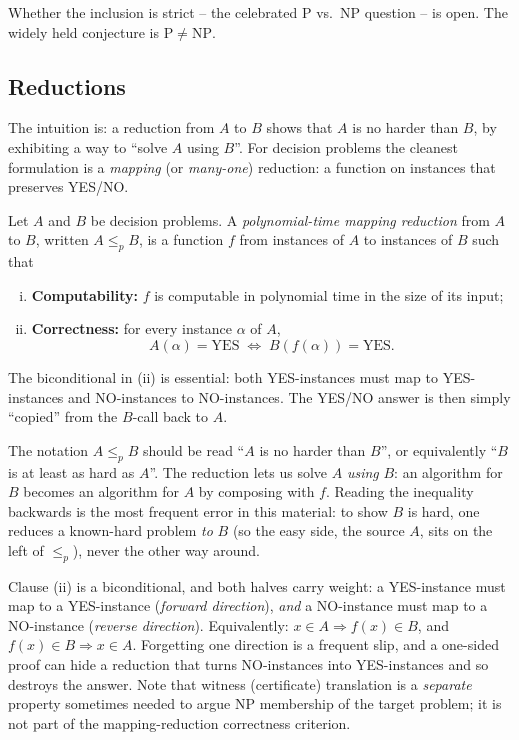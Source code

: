 Whether the inclusion is strict -- the celebrated $\mathrm{P}$ vs.\ $\mathrm{NP}$ question -- is open. The widely held conjecture is $\mathrm{P} \ne \mathrm{NP}$.

\subsection{Reductions}

The intuition is: a reduction from $A$ to $B$ shows that $A$ is no harder than $B$, by exhibiting a way to ``solve $A$ using $B$''. For decision problems the cleanest formulation is a \emph{mapping} (or \emph{many-one}) reduction: a function on instances that preserves YES/NO.

\begin{definition}
\label{def:poly_reduction}
Let $A$ and $B$ be decision problems. A \emph{polynomial-time mapping reduction} from $A$ to $B$, written $A \le_p B$, is a function $f$ from instances of $A$ to instances of $B$ such that
\begin{enumerate}[(i)]
  \item \textbf{Computability:} $f$ is computable in polynomial time in the size of its input;
  \item \textbf{Correctness:} for every instance $\alpha$ of $A$,
  \[
    A(\alpha) = \text{YES} \;\iff\; B(f(\alpha)) = \text{YES}.
  \]
\end{enumerate}
The biconditional in (ii) is essential: both YES-instances must map to YES-instances and NO-instances to NO-instances. The YES/NO answer is then simply ``copied'' from the $B$-call back to $A$.
\end{definition}

\begin{remark}[Direction of $\le_p$]
The notation $A \le_p B$ should be read ``$A$ is no harder than $B$'', or equivalently ``$B$ is at least as hard as $A$''. The reduction lets us solve $A$ \emph{using} $B$: an algorithm for $B$ becomes an algorithm for $A$ by composing with $f$. Reading the inequality backwards is the most frequent error in this material: to show $B$ is hard, one reduces a known-hard problem \emph{to} $B$ (so the easy side, the source $A$, sits on the left of $\le_p$), never the other way around.
\end{remark}

\begin{remark}
Clause (ii) is a biconditional, and both halves carry weight: a YES-instance must map to a YES-instance (\emph{forward direction}), \emph{and} a NO-instance must map to a NO-instance (\emph{reverse direction}). Equivalently: $x \in A \Rightarrow f(x) \in B$, and $f(x) \in B \Rightarrow x \in A$. Forgetting one direction is a frequent slip, and a one-sided proof can hide a reduction that turns NO-instances into YES-instances and so destroys the answer. Note that witness (certificate) translation is a \emph{separate} property sometimes needed to argue NP membership of the target problem; it is not part of the mapping-reduction correctness criterion.
\end{remark}

